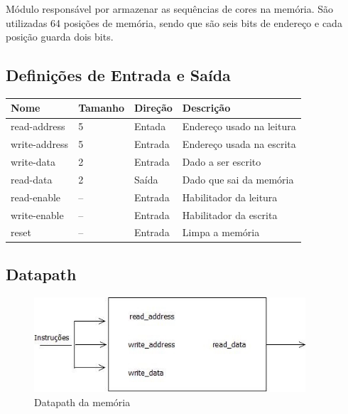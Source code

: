 \documentclass{report}
\begin{document}
    Módulo responsável por armazenar as sequências de cores na memória. São utilizadas 64 posições de memória, sendo que são seis bits de endereço e cada posição guarda dois bits.
    \subsection{Definições de Entrada e Saída}
    
      \begin{table}[H]
       \centering
        \begin{tabular}[pos]{|m{2cm} |m{2cm}| m{6cm} | m{3cm}|} 
         \hline
          \cellcolor[gray]{0.9}
           \textbf{Nome} & \cellcolor[gray]{0.9} \textbf{Tamanho}  &\cellcolor[gray]{0.9}\textbf{Direção} & \cellcolor[gray]{0.9}\textbf{Descrição}\\ \hline
                read-address & 5 & Entada & Endereço usado na leitura\\ \hline
                write-address & 5 & Entrada & Endereço usada na escrita  \\ \hline
                write-data & 2 & Entrada & Dado a ser escrito \\ \hline
                read-data & 2 & Saída & Dado que sai da memória \\ \hline
                read-enable & -- & Entrada & Habilitador da leitura \\ \hline
                write-enable & -- & Entrada & Habilitador da escrita \\ \hline
                reset & -- & Entrada & Limpa a memória \\ \hline
        \end{tabular}
       \end{table}
    
    \subsection{Datapath}
    
    \begin{figure}[H] \centering \includegraphics[width=0.9\textwidth]{memo.jpg} \caption{Datapath da memória} \label{fig:mesh1} \end{figure}
    
\end{document}
